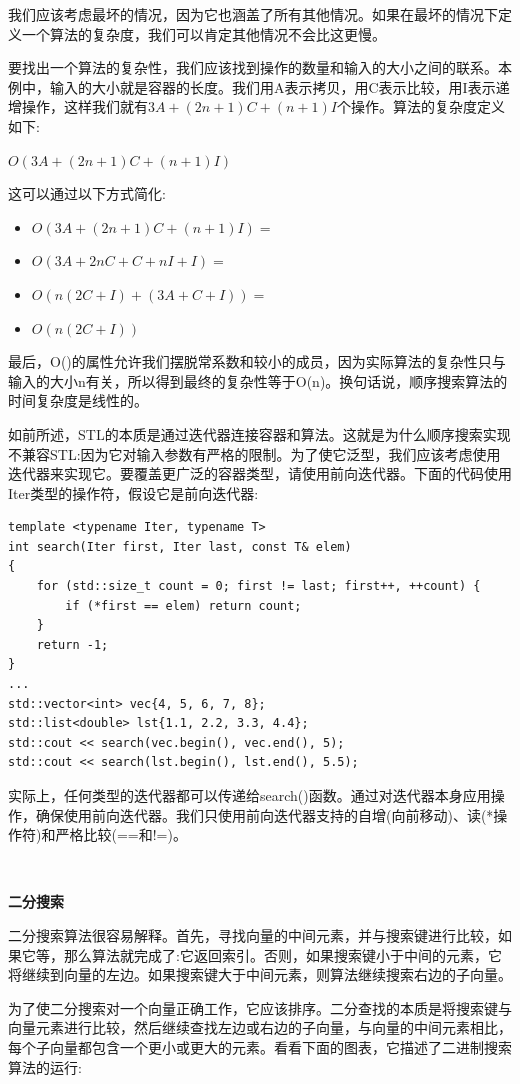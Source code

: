 我们应该考虑最坏的情况，因为它也涵盖了所有其他情况。如果在最坏的情况下定义一个算法的复杂度，我们可以肯定其他情况不会比这更慢。 \par
要找出一个算法的复杂性，我们应该找到操作的数量和输入的大小之间的联系。本例中，输入的大小就是容器的长度。我们用A表示拷贝，用C表示比较，用I表示递增操作，这样我们就有$3A + (2n + 1)C + (n + 1)I$个操作。算法的复杂度定义如下: \par 

$O(3A + (2n + 1)C + (n + 1)I)$

这可以通过以下方式简化: \par

\begin{itemize}
	\item $O(3A + (2n + 1)C + (n + 1)I) =$
	\item $O(3A + 2nC + C + nI + I) =$
	\item $O(n(2C + I) + (3A + C + I)) =$
	\item $O(n(2C + I))$
\end{itemize}

最后，O()的属性允许我们摆脱常系数和较小的成员，因为实际算法的复杂性只与输入的大小n有关，所以得到最终的复杂性等于O(n)。换句话说，顺序搜索算法的时间复杂度是线性的。 \par
如前所述，STL的本质是通过迭代器连接容器和算法。这就是为什么顺序搜索实现不兼容STL:因为它对输入参数有严格的限制。为了使它泛型，我们应该考虑使用迭代器来实现它。要覆盖更广泛的容器类型，请使用前向迭代器。下面的代码使用Iter类型的操作符，假设它是前向迭代器: \par

\begin{lstlisting}[caption={}]
template <typename Iter, typename T>
int search(Iter first, Iter last, const T& elem)
{
	for (std::size_t count = 0; first != last; first++, ++count) {
		if (*first == elem) return count;
	}
	return -1;
}
...
std::vector<int> vec{4, 5, 6, 7, 8};
std::list<double> lst{1.1, 2.2, 3.3, 4.4};
std::cout << search(vec.begin(), vec.end(), 5);
std::cout << search(lst.begin(), lst.end(), 5.5);
\end{lstlisting}

实际上，任何类型的迭代器都可以传递给search()函数。通过对迭代器本身应用操作，确保使用前向迭代器。我们只使用前向迭代器支持的自增(向前移动)、读(*操作符)和严格比较(==和!=)。 \par

\noindent\textbf{}\ \par
\textbf{二分搜索} \ \par
二分搜索算法很容易解释。首先，寻找向量的中间元素，并与搜索键进行比较，如果它等，那么算法就完成了:它返回索引。否则，如果搜索键小于中间的元素，它将继续到向量的左边。如果搜索键大于中间元素，则算法继续搜索右边的子向量。 \par
为了使二分搜索对一个向量正确工作，它应该排序。二分查找的本质是将搜索键与向量元素进行比较，然后继续查找左边或右边的子向量，与向量的中间元素相比，每个子向量都包含一个更小或更大的元素。看看下面的图表，它描述了二进制搜索算法的运行: \par

